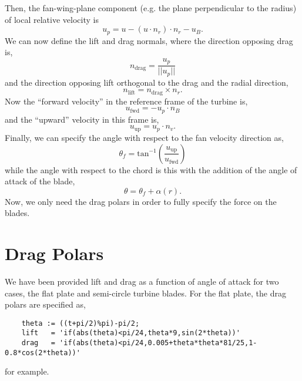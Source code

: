 \documentclass{article}
\begin{document}
Then, the fan-wing-plane component (e.g. the plane perpendicular to the 
radius) of local relative velocity is
\begin{equation}
u_p = u - (u\cdot n_r)\cdot n_r - u_B. 
\end{equation}
We can now define the lift and drag normals, where the direction
opposing drag is, 
\begin{equation}
n_{\text{drag}} = \frac{u_p}{||u_p||} 
\end{equation}
and the direction opposing lift orthogonal to the drag and the radial direction, 
\begin{equation}
n_{\text{lift}}= n_{\text{drag}} \times n_r. 
\end{equation}
Now the ``forward velocity'' in the reference frame of the turbine is, 
\begin{equation}
u_{\text{fwd}}= -u_p \cdot n_B
\end{equation}
and the ``upward'' velocity in this frame is, 
\begin{equation}
u_{\text{up}} = u_p \cdot n_v. 
\end{equation}
Finally, we can specify the angle with respect to the fan velocity
direction as, 
\begin{equation}
 \theta_f = \text{tan}^{-1}\left(\frac{u_{\text{up}}}{u_{\text{fwd}}}\right)
\end{equation}
while the angle with respect to the chord is this with the addition of
the angle of attack of the blade, 
\begin{equation}
 \theta = \theta_f + \alpha(r).
\end{equation}
Now, we only need the drag polars in order to fully specify the force
on the blades.

\newpage
\section{Drag Polars}

We have been provided lift and drag as a function of angle of attack for
two cases, the flat plate and semi-circle turbine blades. 
For the flat plate, the drag polars are specified as,

\begin{lstlisting}
    theta := ((t+pi/2)%pi)-pi/2; 
    lift   = 'if(abs(theta)<pi/24,theta*9,sin(2*theta))'
    drag   = 'if(abs(theta)<pi/24,0.005+theta*theta*81/25,1-0.8*cos(2*theta))'
\end{lstlisting}
for example. 
\end{document}
